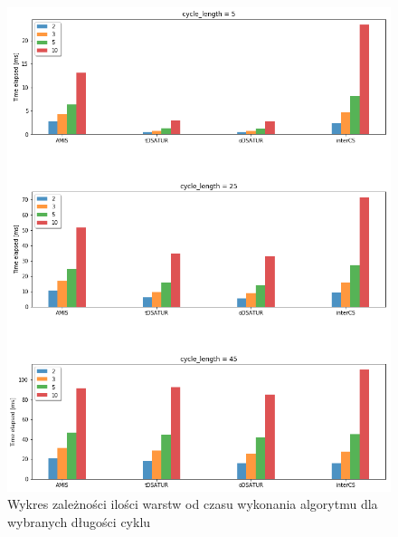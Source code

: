 \documentclass[10pt,a4paper]{article}
\begin{document}
	\vspace*{\fill}
	\begin{figure}[H]
		\begin{center}
			\includegraphics[width=\textwidth]{images/tests/odd_cycles/performance_per_folds.png}
			\caption{Wykres zależności ilości warstw od czasu wykonania algorytmu dla wybranych długości cyklu}
		\end{center}
	\end{figure}
	\vspace*{\fill}
	
	\pagebreak
	
\end{document}
